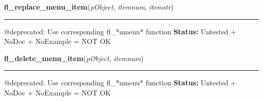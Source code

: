    \label{xformslib:deprecated:fl_replace_menu_item}

    \vspace{0.5ex}

\hspace{.8\funcindent}\begin{boxedminipage}{\funcwidth}

    \raggedright \textbf{fl\_replace\_menu\_item}(\textit{pObject}, \textit{itemnum}, \textit{itemstr})

    \vspace{-1.5ex}

    \rule{\textwidth}{0.5\fboxrule}
\setlength{\parskip}{2ex}

@deprecated: Use corresponding fl\_*nmenu* function
\setlength{\parskip}{1ex}
\textbf{Status:} 
Untested + NoDoc + NoExample = NOT OK


    \end{boxedminipage}

    \label{xformslib:deprecated:fl_delete_menu_item}

    \vspace{0.5ex}

\hspace{.8\funcindent}\begin{boxedminipage}{\funcwidth}

    \raggedright \textbf{fl\_delete\_menu\_item}(\textit{pObject}, \textit{itemnum})

    \vspace{-1.5ex}

    \rule{\textwidth}{0.5\fboxrule}
\setlength{\parskip}{2ex}

@deprecated: Use corresponding fl\_*nmenu* function
\setlength{\parskip}{1ex}
\textbf{Status:} 
Untested + NoDoc + NoExample = NOT OK


    \end{boxedminipage}

    \label{xformslib:deprecated:fl_set_menu_item_callback}

    \vspace{0.5ex}

